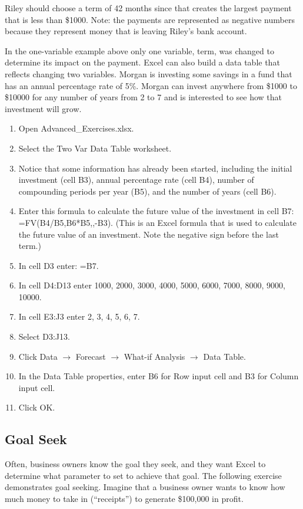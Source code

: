 Riley should choose a term of 42 months since that creates the largest payment that is less than \$1000. Note: the payments are represented as negative numbers because they represent money that is leaving Riley’s bank account.

In the one-variable example above only one variable, term, was changed to determine its impact on the payment. Excel can also build a data table that reflects changing two variables. Morgan is investing some savings in a fund that has an annual percentage rate of 5\%. Morgan can invest anywhere from \$1000 to \$10000 for any number of years from 2 to 7 and is interested to see how that investment will grow.

\begin{enumerate}
	\item Open Advanced\_Exercises.xlsx.
	\item Select the Two Var Data Table worksheet.
	\item Notice that some information has already been started, including the initial investment (cell B3), annual percentage rate (cell B4), number of compounding periods per year (B5), and the number of years (cell B6).
	\item Enter this formula to calculate the future value of the investment in cell B7: =FV(B4/B5,B6*B5,,-B3). (This is an Excel formula that is used to calculate the future value of an investment. Note the negative sign before the last term.)
	\item In cell D3 enter: =B7.
	\item In cell D4:D13 enter 1000, 2000, 3000, 4000, 5000, 6000, 7000, 8000, 9000, 10000.
	\item In cell E3:J3 enter 2, 3, 4, 5, 6, 7.
	\item Select D3:J13.
	\item Click Data $\rightarrow$ Forecast $\rightarrow$ What-if Analysis $\rightarrow$ Data Table.
	\item In the Data Table properties, enter B6 for Row input cell and B3 for Column input cell.
	\item Click OK.
\end{enumerate}

\subsection{Goal Seek}

Often, business owners know the goal they seek, and they want Excel to determine what parameter to set to achieve that goal. The following exercise demonstrates goal seeking. Imagine that a business owner wants to know how much money to take in (“receipts”) to generate \$100,000 in profit.

